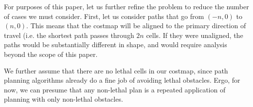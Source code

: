 For purposes of this paper, let us further refine the problem to reduce the number of cases we must consider. First, let us consider paths that go from $(-n, 0)$ to $(n, 0)$. This means that the costmap will be aligned to the primary direction of travel (i.e. the shortest path passes through $2n$ cells. If they were unaligned, the paths would be substantially different in shape, and would require analysis beyond the scope of this paper. 

We further assume that there are no lethal cells in our costmap, since path planning algorithms already do a fine job of avoiding lethal obstacles. Ergo, for now, we can presume that any non-lethal plan is a repeated application of planning with only non-lethal obstacles. 



